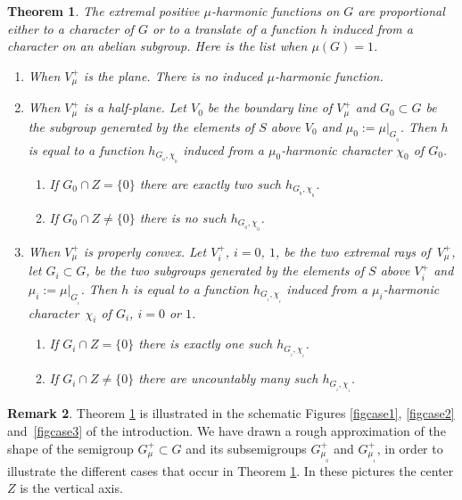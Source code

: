 \documentclass[JEP,XML,SOM,Unicode]{cedram}
\newtheorem{Thm}{Theorem}[section]
\theoremstyle{definition}
\newtheorem{Rem}[Thm]{Remark}
\begin{document}
\begin{Thm}
\label{thconclu}
The extremal positive $\mu$-harmonic functions on $G$ are
proportional either to a character
of $G$ or to a translate of a function $h$ induced from a character on an abelian subgroup.
Here is the list when $\mu(G)\!=\!1$.

\begin{enumerate}
\item\label{thconclu1}
\emph{When $V^+_\mu$ is the plane}. There is no induced $\mu$-harmonic function.

\item\label{thconclu2}
\emph{When $V^+_\mu$ is a half-plane}. Let $V_0$ be the boundary line of $V^+_\mu$
and $G_0\subset G$ be the subgroup
generated by the
elements of $S$ above $V_0$ and $\mu_0:=\mu|_{G_{_0}}$.
Then $h$ is equal to a function $h_{G_{_0},\chi_{_0}}$ induced from a $\mu_0$-harmonic character $\chi_0$ of $G_0$.
\begin{enumerate}
\item\label{thconclu2a}
If $G_0\cap Z = \{ 0\}$
there are exactly two such $h_{G_{_0},\chi_{_0}}$.

\item\label{thconclu2b}
If $G_0\cap Z\neq \{ 0\}$ there is no such $h_{G_{_0},\chi_{_0}}$.
\end{enumerate}

\item\label{thconclu3}
\emph{When $V^+_\mu$ is properly convex}. Let $V^+_i$, $i=0$, $1$, be the two
extremal rays of~$V^+_\mu$, let $G_i\subset G$,
be the two subgroups generated by the
elements of $S$ above $V^+_i$ and $\mu_i:=\mu|_{G_{_i}}$.
Then $h$ is equal to a function $h_{G_{_i},\chi_{_i}}$ induced from a $\mu_i$-harmonic character~$\chi_i$ of $G_i$, $i=0$ or $1$.
\begin{enumerate}
\item\label{thconclu3a}
If $G_i\cap Z = \{ 0\}$
there is exactly one such $h_{G_{_i},\chi_{_i}}$.

\item\label{thconclu3b}
If $G_i\cap Z\neq \{ 0\}$
there are uncountably many such $h_{G_{_i},\chi_{_i}}$.
\end{enumerate}
\end{enumerate}
\end{Thm}

\begin{Rem}
Theorem \ref{thconclu} is illustrated in the schematic Figures \ref{figcase1}, \ref{figcase2} and~\ref{figcase3} of the introduction. We have drawn a rough approximation
of the shape of the semigroup $G^+_\mu\subset G$
and its subsemigroups $G^+_{\mu_{_0}}$ and $G^+_{\mu_{_1}}$,
in order to illustrate the different cases that occur in Theorem \ref{thconclu}.
In these pictures the center $Z$ is the vertical axis.
\end{Rem}
\end{document}
